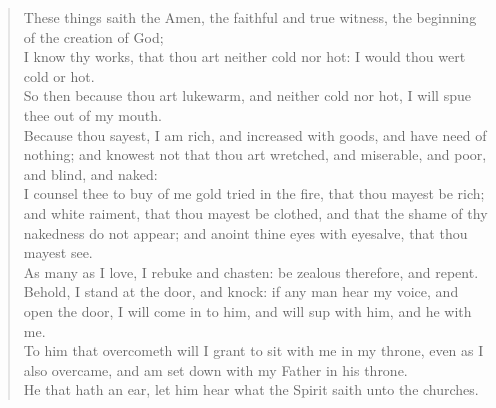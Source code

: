 \documentclass[MAIN]{subfiles}
\begin{document}
\begin{verse}
These things saith the Amen, the faithful and true witness, the beginning of the creation of God;\\
I know thy works, that thou art neither cold nor hot: I would thou wert cold or hot.\\
So then because thou art lukewarm, and neither cold nor hot, I will spue thee out of my mouth.\\
Because thou sayest, I am rich, and increased with goods, and have need of nothing; and knowest not that thou art wretched, and miserable, and poor, and blind, and naked:\\
I counsel thee to buy of me gold tried in the fire, that thou mayest be rich; and white raiment, that thou mayest be clothed, and that the shame of thy nakedness do not appear; and anoint thine eyes with eyesalve, that thou mayest see.\\
As many as I love, I rebuke and chasten: be zealous therefore, and repent.\\
Behold, I stand at the door, and knock: if any man hear my voice, and open the door, I will come in to him, and will sup with him, and he with me.\\
To him that overcometh will I grant to sit with me in my throne, even as I also overcame, and am set down with my Father in his throne.\\
He that hath an ear, let him hear what the Spirit saith unto the churches.
\end{verse}
\end{document}
